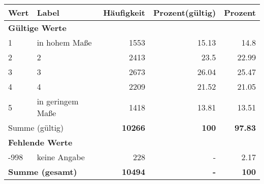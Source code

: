      \begin{longtable}{lXrrr}
     \toprule
     \textbf{Wert} & \textbf{Label} & \textbf{Häufigkeit} & \textbf{Prozent(gültig)} & \textbf{Prozent} \\
     \endhead
     \midrule
     \multicolumn{5}{l}{\textbf{Gültige Werte}}\\

     1 &
     \multicolumn{1}{X}{ in hohem Maße   } &


       \num{1553} &
       \num[round-mode=places,round-precision=2]{15.13} &
         \num[round-mode=places,round-precision=2]{14.8} \\

     2 &
     \multicolumn{1}{X}{ 2   } &


       \num{2413} &
       \num[round-mode=places,round-precision=2]{23.5} &
         \num[round-mode=places,round-precision=2]{22.99} \\

     3 &
     \multicolumn{1}{X}{ 3   } &


       \num{2673} &
       \num[round-mode=places,round-precision=2]{26.04} &
         \num[round-mode=places,round-precision=2]{25.47} \\

     4 &
     \multicolumn{1}{X}{ 4   } &


       \num{2209} &
       \num[round-mode=places,round-precision=2]{21.52} &
         \num[round-mode=places,round-precision=2]{21.05} \\

     5 &
     \multicolumn{1}{X}{ in geringem Maße   } &


       \num{1418} &
       \num[round-mode=places,round-precision=2]{13.81} &
         \num[round-mode=places,round-precision=2]{13.51} \\
     \midrule
     \multicolumn{2}{l}{Summe (gültig)} &
       \textbf{\num{10266}} &
     \textbf{\num{100}} &
       \textbf{\num[round-mode=places,round-precision=2]{97.83}} \\
     \multicolumn{5}{l}{\textbf{Fehlende Werte}}\\
       -998 &
       keine Angabe &
         \num{228} &
        - &
         \num[round-mode=places,round-precision=2]{2.17} \\
     \midrule
     \multicolumn{2}{l}{\textbf{Summe (gesamt)}} &
          \textbf{\num{10494}} &
        \textbf{-} &
        \textbf{\num{100}} \\
     \bottomrule
     \end{longtable}
     
